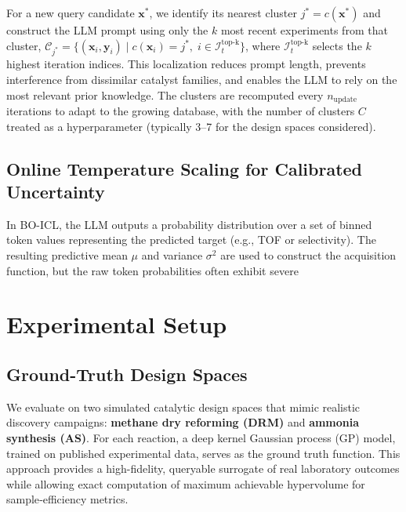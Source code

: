 \documentclass{article}
\begin{document}
For a new query candidate $\mathbf{x}^*$, we identify its nearest cluster $j^* = c(\mathbf{x}^*)$ and construct the LLM prompt using only the $k$ most recent experiments from that cluster, $\mathcal{C}_{\!j^*} = \{ (\mathbf{x}_i, \mathbf{y}_i) \mid c(\mathbf{x}_i)=j^*,\; i \in \mathcal{I}_t^{\text{top-k}} \}$, where $\mathcal{I}_t^{\text{top-k}}$ selects the $k$ highest iteration indices. This localization reduces prompt length, prevents interference from dissimilar catalyst families, and enables the LLM to rely on the most relevant prior knowledge. The clusters are recomputed every $n_{\text{update}}$ iterations to adapt to the growing database, with the number of clusters $C$ treated as a hyperparameter (typically 3--7 for the design spaces considered).

\subsection{Online Temperature Scaling for Calibrated Uncertainty}
In BO-ICL, the LLM outputs a probability distribution over a set of binned token values representing the predicted target (e.g., TOF or selectivity). The resulting predictive mean $\mu$ and variance $\sigma^2$ are used to construct the acquisition function, but the raw token probabilities often exhibit severe

\section{Experimental Setup}

\subsection{Ground-Truth Design Spaces}
We evaluate on two simulated catalytic design spaces that mimic realistic discovery campaigns: \textbf{methane dry reforming (DRM)} and \textbf{ammonia synthesis (AS)}. For each reaction, a deep kernel Gaussian process (GP) model, trained on published experimental data, serves as the ground truth function. This approach provides a high-fidelity, queryable surrogate of real laboratory outcomes while allowing exact computation of maximum achievable hypervolume for sample‑efficiency metrics.
\end{document}
